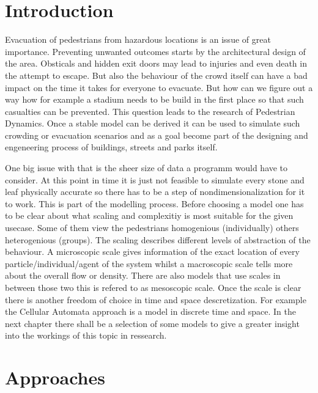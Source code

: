 

\section{Introduction}

Evacuation of pedestrians from hazardous locations is an issue of great importance. 
Preventing unwanted outcomes starts by the architectural design of the area.
Obsticals and hidden exit doors may lead to injuries and even death in the attempt to escape.
But also the behaviour of the crowd itself can have a bad impact on the time it takes for everyone to evacuate.
But how can we figure out a way how for example a stadium needs to be build in the first place so that such casualties can be prevented.
This question leads to the research of Pedestrian Dynamics. 
Once a stable model can be derived it can be used to simulate such crowding or evacuation scenarios and as a goal 
become part of the designing and engeneering process of buildings, streets and parks itself.

One big issue with that is the sheer size of data a programm would have to consider. 
At this point in time it is just not feasible to simulate every stone and leaf physically accurate
so there has to be a step of nondimensionalization for it to work. 
This is part of the modelling process. 
Before choosing a model one has to be clear about what scaling and complexitiy is most suitable for the given usecase.
Some of them view the pedestrians homogenious (individually) others heterogenious (groups).
The scaling describes different levels of abstraction of the behaviour.
A microscopic scale gives information of the exact location of every particle/individual/agent of the system 
whilst a macroscopic scale tells more about the overall flow or density. There are also models that use scales in between 
those two this is refered to as mesoscopic scale. 
Once the scale is clear there is another freedom of choice in time and space descretization. 
For example the Cellular Automata approach is a model in discrete time and space. 
In the next chapter there shall be a selection of some models to give a greater insight into the workings of this topic in ressearch.

\newpage
\section{Approaches}
